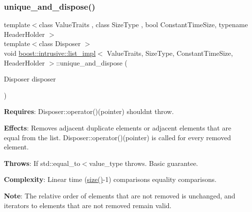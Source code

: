 \subsubsection{\texorpdfstring{unique\+\_\+and\+\_\+dispose()}{unique\_and\_dispose()}\hspace{0.1cm}{\footnotesize\ttfamily [1/2]}}
{\footnotesize\ttfamily template$<$class Value\+Traits , class Size\+Type , bool Constant\+Time\+Size, typename Header\+Holder $>$ \\
template$<$class Disposer $>$ \\
void \hyperlink{classboost_1_1intrusive_1_1list__impl}{boost\+::intrusive\+::list\+\_\+impl}$<$ Value\+Traits, Size\+Type, Constant\+Time\+Size, Header\+Holder $>$\+::unique\+\_\+and\+\_\+dispose (\begin{DoxyParamCaption}\item[{Disposer}]{disposer }\end{DoxyParamCaption})\hspace{0.3cm}{\ttfamily [inline]}}

{\bfseries Requires}\+: Disposer\+::operator()(pointer) shouldn\textquotesingle{}t throw.

{\bfseries Effects}\+: Removes adjacent duplicate elements or adjacent elements that are equal from the list. Disposer\+::operator()(pointer) is called for every removed element.

{\bfseries Throws}\+: If std\+::equal\+\_\+to$<$value\+\_\+type throws. Basic guarantee.

{\bfseries Complexity}\+: Linear time (\hyperlink{classboost_1_1intrusive_1_1list__impl_a9da0074a31566f3a7dbc3cd1a2d752c1}{size()}-\/1) comparisons equality comparisons.

{\bfseries Note}\+: The relative order of elements that are not removed is unchanged, and iterators to elements that are not removed remain valid. \mbox{\label{classboost_1_1intrusive_1_1list__impl_ad3b3e0225cd52b5563fe2f2a2b49e3b2}} 
